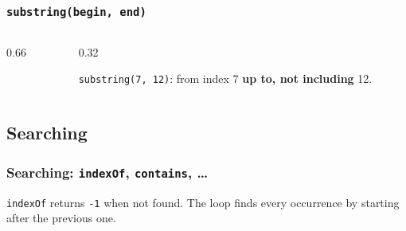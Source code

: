 \documentclass[aspectratio=169,10pt,compress]{beamer}
\begin{document}
\begin{frame}[t,fragile] \frametitle{\texttt{substring(begin, end)}}
  \begin{columns}[T]
    \begin{column}{0.66\textwidth}
    \end{column}
    \begin{column}{0.32\textwidth}
      \begin{center}
      \end{center}
      \small \texttt{substring(7, 12)}: from index 7 \textbf{up to, not including} 12.
      \vspace{0.3em}

    \end{column}
  \end{columns}
\end{frame}


\subsection[Search]{Searching}




\begin{frame}[t,fragile] \frametitle{Searching: \texttt{indexOf}, \texttt{contains}, \dots}

  \vspace{0.3em}
  \small \texttt{indexOf} returns \texttt{-1} when not found. The loop finds every occurrence by starting after the previous one.
\end{frame}

\end{document}
